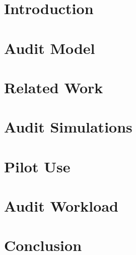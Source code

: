 \section{Introduction}
\label{sec:intro}


\section{Audit Model}
\label{sec:model}


\section{Related Work}
\label{sec:related}


\section{\Providence}
\label{sec:prov}


\section{\Providence Audit Simulations}
\label{sec:sims}


\section{Pilot Use}
\label{sec:pilot}


\section{Audit Workload}
\label{sec:workload}


\section{Conclusion}
\label{sec:conc}


